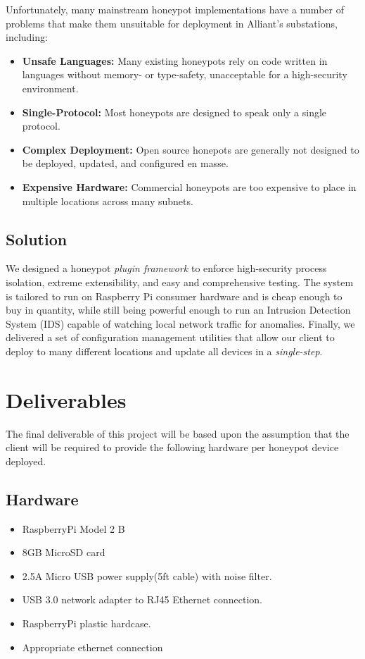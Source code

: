 Unfortunately, many mainstream honeypot implementations have a number of
problems that make them unsuitable for deployment in Alliant's substations,
including:

\begin{itemize}
\setlength{\columnsep}{0cm}
\def\columnseprulecolor{}
\item\textbf{Unsafe Languages:} Many existing honeypots rely on code written in languages without memory- or type-safety, unacceptable for a high-security environment.

\item\textbf{Single-Protocol:} Most honeypots are designed to speak only a single protocol.

\item\textbf{Complex Deployment:} Open source honepots are generally not designed to be deployed, updated, and configured en masse.

\item\textbf{Expensive Hardware:} Commercial honeypots are too expensive to place in multiple locations across many subnets.
\end{itemize}

\subsection{Solution}

We designed a honeypot \textit{plugin framework}
to enforce high-security process isolation, extreme extensibility, and
easy and comprehensive testing. The system is tailored to run on Raspberry
Pi consumer hardware and is cheap enough to buy in quantity, while
still being powerful enough to run an Intrusion Detection System (IDS) capable
of watching local network traffic for anomalies. Finally, we delivered a set
of configuration management utilities that allow our client to deploy to
many different locations and update all devices in a \textit{single-step}.

\section{Deliverables}

The final deliverable of this project will be based upon the assumption that the client will be required to provide the following hardware per honeypot device deployed.

\subsection{Hardware}
\begin{itemize}
\item RaspberryPi Model 2 B
\item 8GB MicroSD card
\item 2.5A Micro USB power supply(5ft cable) with noise filter.
\item USB 3.0 network adapter to RJ45 Ethernet connection.
\item RaspberryPi plastic hardcase.
\item Appropriate ethernet connection
\end{itemize}

